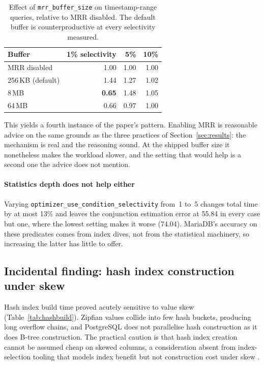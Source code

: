 \documentclass[preprint,12pt,authoryear]{elsarticle}
\begin{document}
\begin{table}[htbp]
\centering
\caption{Effect of \texttt{mrr\_buffer\_size} on timestamp-range
queries, relative to MRR disabled. The default buffer is
counterproductive at every selectivity measured.}
\label{tab:mrrbuffer}
\small
\begin{tabular}{@{}lrrr@{}}
\toprule
Buffer & 1\% selectivity & 5\% & 10\% \\
\midrule
MRR disabled & 1.00 & 1.00 & 1.00 \\
256\,KB (default) & 1.44 & 1.27 & 1.02 \\
8\,MB & \textbf{0.65} & 1.48 & 1.05 \\
64\,MB & 0.66 & 0.97 & 1.00 \\
\bottomrule
\end{tabular}
\end{table}

This yields a fourth instance of the paper's pattern. Enabling MRR is
reasonable advice on the same grounds as the three practices of
Section~\ref{sec:results}: the mechanism is real and the reasoning
sound. At the shipped buffer size it nonetheless makes the workload
slower, and the setting that would help is a second one the advice does
not mention.

\paragraph{Statistics depth does not help either}
Varying \texttt{optimizer\_use\_condition\_selectivity} from~1 to~5
changes total time by at most 13\% and leaves the conjunction
estimation error at 55.84 in every case but one, where the lowest
setting makes it worse (74.04). MariaDB's accuracy on these predicates
comes from index dives, not from the statistical machinery, so
increasing the latter has little to offer.

\subsection{Incidental finding: hash index construction under skew}

Hash index build time proved acutely sensitive to value skew
(Table~\ref{tab:hashbuild}). Zipfian values collide into few hash
buckets, producing long overflow chains, and PostgreSQL does not
parallelise hash construction as it does B-tree construction. The
practical caution is that hash index creation cannot be assumed cheap
on skewed columns, a consideration absent from index-selection
tooling that models index benefit but not construction cost under
skew \citep{kossmann2020magic}.
\end{document}
